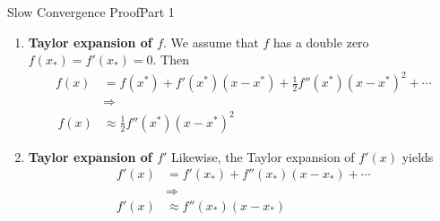 \documentclass[10pt]{beamer}
\begin{document}


    
\begin{frame}{Slow Convergence Proof}{Part 1}

\begin{enumerate}
\item[1.] \textbf{Taylor expansion of $f$}.  
      We assume that \(f\) has a double zero \(f(x_{*}) = f'(x_{*}) = 0\). Then
      \begin{align*}
          f(x) &= f(x^{*}) + f'(x^{*})(x-x^{*}) + \tfrac12 f''(x^{*})(x-x^{*})^{2}+\cdots\\
               &\Longrightarrow\\
          \,f(x) &\approx \tfrac12 f''(x^{*})(x-x^{*})^{2}
      \end{align*}
    

\item[2.] \textbf{Taylor expansion of $f'$}  
      Likewise, the Taylor expansion of $f'(x)$ yields
      \begin{align*}
          f'(x) &= f'(x_{*}) + f''(x_{*})(x-x_{*}) + \cdots\\
          &\Longrightarrow\\
          f'(x) &\approx f''(x_{*})(x-x_{*}) 
      \end{align*}
\end{enumerate}

\end{frame}
\end{document}
